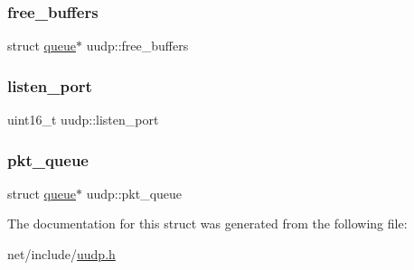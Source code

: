 \subsubsection{\texorpdfstring{free\+\_\+buffers}{free\_buffers}}
{\footnotesize\ttfamily struct \hyperlink{structqueue}{queue}$\ast$ uudp\+::free\+\_\+buffers}

\mbox{\label{structuudp_a00e34c9d365186d751ac02d8fd8fb130}} 
\subsubsection{\texorpdfstring{listen\+\_\+port}{listen\_port}}
{\footnotesize\ttfamily uint16\+\_\+t uudp\+::listen\+\_\+port}

\mbox{\label{structuudp_a173d6e92d93ed6c5a8e6bae66a66c132}} 
\subsubsection{\texorpdfstring{pkt\+\_\+queue}{pkt\_queue}}
{\footnotesize\ttfamily struct \hyperlink{structqueue}{queue}$\ast$ uudp\+::pkt\+\_\+queue}



The documentation for this struct was generated from the following file\+:\begin{DoxyCompactItemize}
\item 
net/include/\hyperlink{uudp_8h}{uudp.\+h}\end{DoxyCompactItemize}
